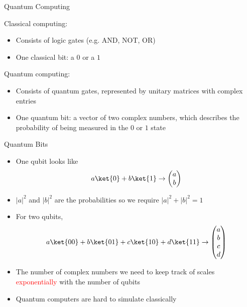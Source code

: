 \documentclass[xcolor=dvipsnames]{beamer}
\begin{document}
\begin{frame}{Quantum Computing}

  \begin{minipage}[t]{0.48\linewidth}
      Classical computing:
      \begin{itemize}
          \item Consists of logic gates (e.g. AND, NOT, OR)
          \item One classical bit: a $0$ or a $1$
      \end{itemize}
  \end{minipage}
  \hfill
  \begin{minipage}[t]{0.48\linewidth}
      Quantum computing:
      \begin{itemize}
          \item Consists of quantum gates, represented by unitary matrices with complex entries
          \item One quantum bit: a vector of two complex numbers, which describes the probability of being measured in the $0$ or $1$ state
      \end{itemize}
  \end{minipage}

\end{frame}

\begin{frame}{Quantum Bits}
  \begin{itemize}
    \item One qubit looks like 
    $$a\ket{0}+b\ket{1}\to
    \begin{pmatrix}
      a\\
      b
    \end{pmatrix}$$
    \item $|a|^2$ and $|b|^2$ are the probabilities so we require $|a|^2+|b|^2=1$
    \item For two qubits,  
    $$a\ket{00}+b\ket{01}+c\ket{10}+d\ket{11}\to
    \begin{pmatrix}
      a\\
      b\\
      c\\
      d
    \end{pmatrix}$$
    \item The number of complex numbers we need to keep track of scales \textcolor{red}{exponentially} with the number of qubits
    \item Quantum computers are hard to simulate classically
  \end{itemize}
\end{frame}
\end{document}
